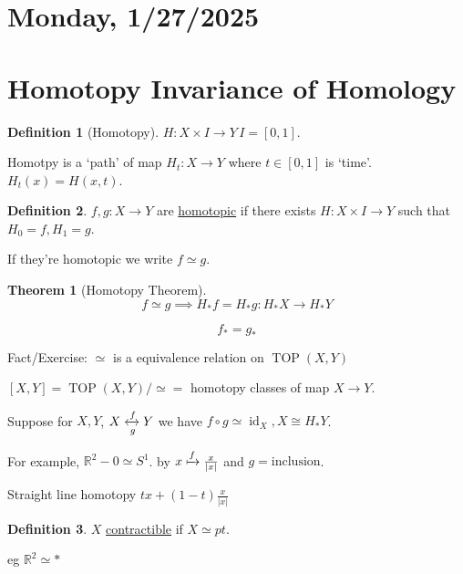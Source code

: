\documentclass{article}
\theoremstyle{definition}
\newtheorem*{definition}{Definition}
\newtheorem{theorem}{Theorem}
\begin{document}
    \section*{Monday, 1/27/2025}
    
    \section*{Homotopy Invariance of Homology}

    \begin{definition}
        [Homotopy] \(H: X \times I \to Y\, I = [0,1]\).

        Homotpy is a `path' of map \(H_t: X \to Y\) where \(t\in [0,1]\) is `time'. \(H_t(x) = H(x,t)\).
    \end{definition}


    \begin{definition}
        \(f,g : X \to Y\) are \underline{homotopic} if there exists \(H: X \times I \to Y\) such that \(H_0 = f, H_1 = g\).
    \end{definition}

    If they're homotopic we write \(f\simeq g\).

    \begin{theorem}
        [Homotopy Theorem]

        \[
            f \simeq g \implies H_{\ast} f = H_{\ast} g: H_{\ast} X \to H_{\ast} Y
        \]

        \[
            f_{\ast} = g_{\ast} 
        \]
    \end{theorem}

    Fact/Exercise: \(\simeq\) is a equivalence relation on \(\operatorname{TOP}(X,Y)\) 

    \([X,Y] = \operatorname{TOP}(X,Y) / \simeq =\) homotopy classes of map \(X \to Y\).

    Suppose for \(X,Y\), \(X \xleftrightarrow[g]{f} Y\) we have \(f \circ g \simeq \operatorname{id}_X,X \cong H_{\ast} Y\).
    
    For example, \(\mathbb{R}^2 - 0 \simeq S^1\). by \(x \xmapsto{f} \frac{x}{\vert x \vert}\) and \(g = \text{inclusion}\).

    Straight line homotopy \(tx + (1-t) \frac{x}{\vert x \vert}\)

    \begin{definition}
        \(X\) \underline{contractible} if \(X \simeq pt\).

        eg \(\mathbb{R}^2 \simeq \ast\) 
    \end{definition}
\end{document}
